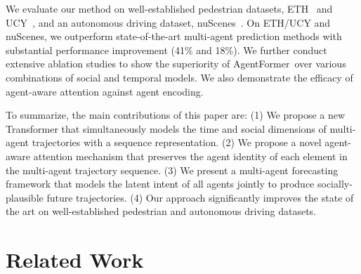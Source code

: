 \documentclass[10pt,twocolumn,letterpaper]{article}
\newcommand{\mname}{AgentFormer}
\begin{document}
We evaluate our method on well-established pedestrian datasets, ETH~\cite{pellegrini2009you} and UCY~\cite{lerner2007crowds}, and an autonomous driving dataset, nuScenes~\cite{caesar2020nuscenes}. On ETH/UCY and nuScenes, we outperform state-of-the-art multi-agent prediction methods with substantial performance improvement (41\% and 18\%). We further conduct extensive ablation studies to show the superiority of \mname\ over various combinations of social and temporal models. We also demonstrate the efficacy of agent-aware attention against agent encoding.

To summarize, the main contributions of this paper are:
(1) We propose a new Transformer that simultaneously models the time and social dimensions of multi-agent trajectories with a sequence representation. (2) We propose a novel agent-aware attention mechanism that preserves the agent identity of each element in the multi-agent trajectory sequence. (3) We present a multi-agent forecasting framework that models the latent intent of all agents jointly to produce socially-plausible future trajectories. (4) Our approach significantly improves the state of the art on well-established pedestrian and autonomous driving datasets.

\section{Related Work}
\end{document}
